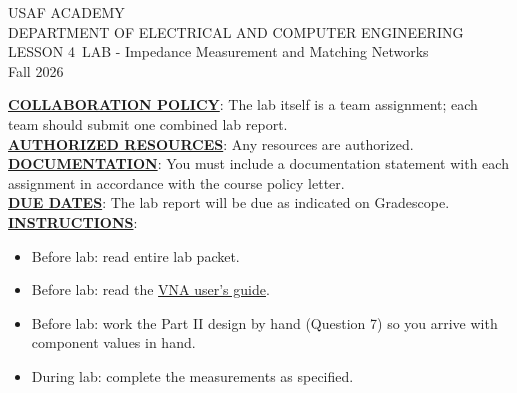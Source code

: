 \documentclass{exam}
\def\labLesson{4}
\def\thisterm{\thisTermIn}
\def\thisterm{Fall 2026}
\begin{document}
\pagestyle{headandfoot}   %


\begin{center}
USAF ACADEMY \\
DEPARTMENT OF ELECTRICAL AND COMPUTER ENGINEERING \\
LESSON \labLesson\ LAB - Impedance Measurement and Matching Networks \\
\thisterm \\[5mm]
\end{center}


\vspace{6pt}

\textbf{\underline{COLLABORATION POLICY}}:  The lab itself is a team assignment; each team should submit one combined lab report. \\

\textbf{\underline{AUTHORIZED RESOURCES}}:  Any resources are authorized. \\

\textbf{\underline{DOCUMENTATION}}: You must include a documentation statement with each assignment in accordance with the course policy letter. \\

\textbf{\underline{DUE DATES}}: The lab report will be due as indicated on Gradescope. \\

\textbf{\underline{INSTRUCTIONS}}:
\begin{itemize}
	\item Before lab: read entire lab packet.
	\item Before lab: read the \href{https://nanorfe.com/nanovna-v2-user-manual.html}{VNA user's guide}.
	\item Before lab: work the Part II design by hand (Question 7) so you arrive with component values in hand.
	\item During lab: complete the measurements as specified.
\end{itemize}

\vspace{8pt}
\end{document}
